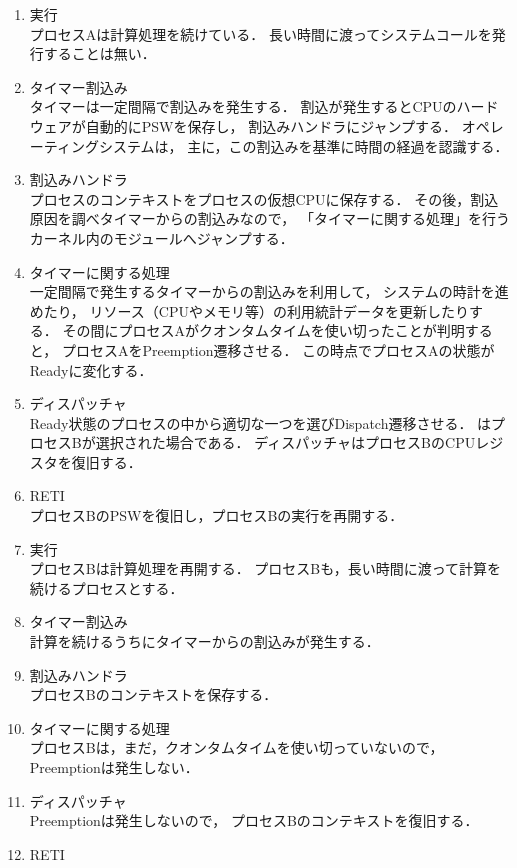 \begin{enumerate}
\item 実行 \\
  プロセスAは計算処理を続けている．
  長い時間に渡ってシステムコールを発行することは無い．
\item タイマー割込み \\
  タイマーは一定間隔で割込みを発生する．
  割込が発生するとCPUのハードウェアが自動的にPSWを保存し，
  割込みハンドラにジャンプする．
  オペレーティングシステムは，
  主に，この割込みを基準に時間の経過を認識する．
\item 割込みハンドラ \\
  プロセスのコンテキストをプロセスの仮想CPUに保存する．
  その後，割込原因を調べタイマーからの割込みなので，
  「タイマーに関する処理」を行うカーネル内のモジュールへジャンプする．
\item タイマーに関する処理 \\
  一定間隔で発生するタイマーからの割込みを利用して，
  システムの時計を進めたり，
  リソース（CPUやメモリ等）の利用統計データを更新したりする．
  その間にプロセスAがクオンタムタイムを使い切ったことが判明すると，
  プロセスAをPreemption遷移させる．
  この時点でプロセスAの状態がReadyに変化する．
\item ディスパッチャ \\
  Ready状態のプロセスの中から適切な一つを選びDispatch遷移させる．
  はプロセスBが選択された場合である．
  ディスパッチャはプロセスBのCPUレジスタを復旧する．
\item RETI \\
  プロセスBのPSWを復旧し，プロセスBの実行を再開する．
\item 実行 \\
  プロセスBは計算処理を再開する．
  プロセスBも，長い時間に渡って計算を続けるプロセスとする．
\item タイマー割込み \\
  計算を続けるうちにタイマーからの割込みが発生する．
\item 割込みハンドラ \\
  プロセスBのコンテキストを保存する．
\item タイマーに関する処理 \\
  プロセスBは，まだ，クオンタムタイムを使い切っていないので，
  Preemptionは発生しない．
\item ディスパッチャ \\
  Preemptionは発生しないので，
  プロセスBのコンテキストを復旧する．
\item RETI \\

\end{enumerate}

